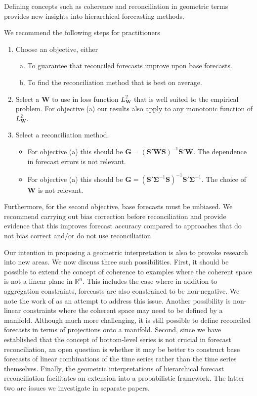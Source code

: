 \documentclass[12pt]{article}
\theoremstyle{definition}
\begin{document}
Defining concepts such as coherence and reconciliation in geometric terms provides new insights into hierarchical forecasting methods. {\color{blue} We recommend the following steps for practitioners
\begin{enumerate}
	\item Choose an objective, either
	\begin{enumerate}[a.]
		\item To guarantee that reconciled forecasts improve upon base forecasts.
		\item To find the reconciliation method that is best on average.
	\end{enumerate}
    \item Select a ${\bm W}$ to use in loss function $L^2_{\bm W}$ that is well suited to the empirical problem.  For objective (a) our results also apply to any monotonic function of $L^2_{\bm W}$.
    \item Select a reconciliation method.  
    \begin{itemize}
    	\item For objective (a) this should be ${\bm G}=({\bm S}'\bm{W}\bm{S})^{-1}\bm{S}'\bm{W}$. The dependence in forecast errors is not relevant.
    	\item For objective (a) this should be ${\bm G}=({\bm S}'\bm{\Sigma}^{-1}\bm{S})^{-1}\bm{S}'\bm{\Sigma}^{-1}$. The choice of ${\bm W}$ is not relevant.
    \end{itemize}
\end{enumerate}}
{\color{blue} Furthermore, for the second objective, base forecasts must be unbiased.  We recommend carrying out} bias correction before reconciliation {\color{blue} and provide evidence that this} improves forecast accuracy compared to approaches that do not bias correct and/or do not use reconciliation.

Our intention in proposing a geometric interpretation is also to provoke research into new areas. We now discuss three such possibilities.  First, it should be possible to extend the concept of coherence {\color{blue}to examples where the coherent space is not a linear plane in $\mathbb{R}^n$.  This includes the case where in addition to aggregation constraints, forecasts are also constrained to be non-negative. We note the work of \cite{wickramasuriya2019optimal} as an attempt to address this issue.  Another possibility is} non-linear constraints where the coherent space may need to be defined by a manifold. Although much more challenging, it is still possible to define reconciled forecasts in terms of projections onto a manifold. Second, since we have established that the concept of bottom-level series is not crucial in forecast reconciliation, an open question is whether it may be better to construct base forecasts of linear combinations of the time series rather than the time series themselves. Finally, the geometric interpretations of hierarchical forecast reconciliation facilitates an extension into a probabilistic framework. The latter two are issues we investigate in separate papers.
\end{document}
